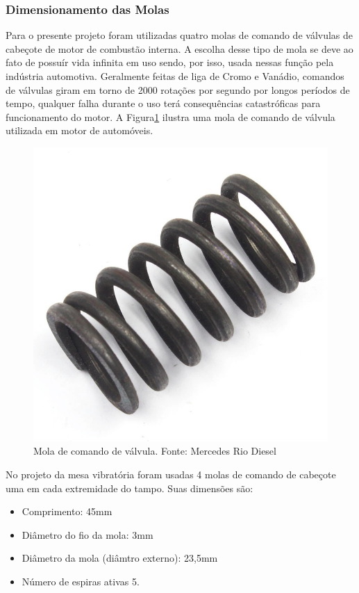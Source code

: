 \subsubsection*{\textbf{Dimensionamento das Molas}}

Para o presente projeto foram utilizadas quatro molas de comando de válvulas de cabeçote de motor de combustão interna. A escolha desse tipo de mola se deve ao fato de possuír vida infinita em uso sendo, por isso, usada nessas função pela indústria automotiva. Geralmente feitas de liga de Cromo e Vanádio, comandos de válvulas giram em torno de 2000 rotações por segundo por longos períodos de tempo, qualquer falha durante o uso terá consequências catastróficas para funcionamento do motor. A  Figura\ref{fig:mola} ilustra uma mola de comando de válvula utilizada em motor de automóveis.

\begin{figure}[H]
\centering
\includegraphics[scale=0.3]{figuras/mola.png}
\caption{Mola de comando de válvula. Fonte: Mercedes Rio Diesel}
\label{fig:mola}
\end{figure}

No projeto da mesa vibratória foram usadas 4 molas de comando de cabeçote uma em cada extremidade do tampo. Suas dimensões são:
\begin{itemize}
\item Comprimento: 45mm
\item Diâmetro do fio da mola: 3mm
\item Diâmetro da mola (diâmtro externo): 23,5mm
\item Número de espiras ativas 5.
\end{itemize}


